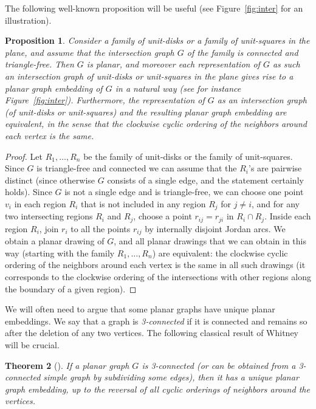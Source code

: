 \documentclass[a4paper,reqno, 12pt]{amsart}
\newtheorem{theorem}{Theorem}[section]
\newtheorem{proposition}[theorem]{Proposition}
\begin{document}
The following well-known proposition will be useful (see Figure~\ref{fig:inter} for an illustration). 

\begin{proposition}\label{pro:trifree}
Consider a family of unit-disks or a family of unit-squares in the
plane, and assume that the intersection graph $G$ of the family is
connected and 
triangle-free. Then $G$  is planar, and moreover each representation of $G$ as such
an intersection graph of unit-disks or unit-squares in the plane  gives rise to a planar graph
embedding of $G$ in
a natural way (see for instance Figure~\ref{fig:inter}). Furthermore, the
 representation of $G$ as an intersection graph (of unit-disks or unit-squares) and the resulting planar graph embedding are equivalent, in the sense that the clockwise cyclic ordering of the neighbors around
 each vertex is the same.
\end{proposition}

\begin{proof}
  Let $R_1,\ldots,R_n$ be the family of unit-disks or the family of unit-squares.
Since $G$ is triangle-free and connected we can assume that the
$R_i$'s are pairwise distinct (since otherwise $G$ consists of a
single edge, and the statement certainly holds). Since $G$ is not a
single edge and is triangle-free, we can choose
one point $v_i$ in each region $R_i$ that is not included in any
region $R_j$ for $j\ne i$, and for any two
intersecting regions $R_i$ and $R_j$, choose a point $r_{ij}=r_{ji}$ in $R_i \cap
R_j$. Inside each region $R_i$, join $r_i$ to all the points
$r_{ij}$ by internally disjoint Jordan arcs. We obtain a planar
drawing of $G$, and all planar drawings that we can obtain in this way
(starting with  the family $R_1, \ldots, R_n$) are equivalent: the clockwise cyclic ordering of the neighbors around
each vertex is the same  in all such drawings (it corresponds to
the clockwise ordering of the intersections with other regions along
the boundary of a given region).
\end{proof}

We will often need to argue that some planar graphs have unique
planar embeddings.
We say that a graph is \emph{3-connected} if it is connected and remains so after the deletion of any two vertices.
The following classical result of Whitney will be crucial.

\begin{theorem}[\cite{Whi32}]\label{thm:whi}
If a planar graph $G$ is 3-connected (or can be
obtained from a 3-connected simple graph by subdividing some edges),
then it has a unique planar graph embedding, up to the reversal of all
cyclic orderings of neighbors around the vertices.
\end{theorem}
\end{document}
